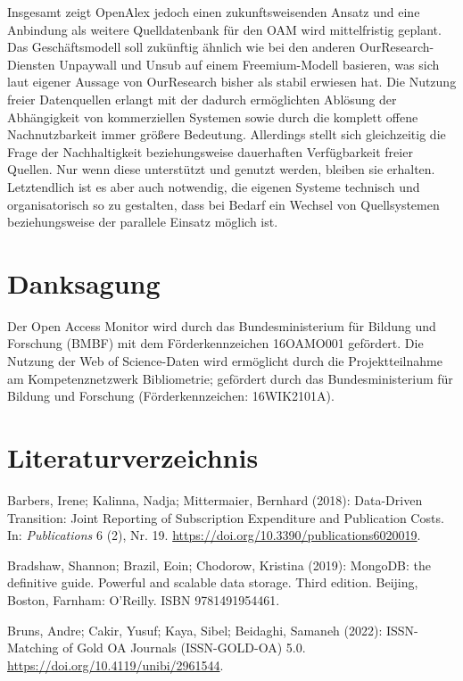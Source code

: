 \documentclass[a4paper,
fontsize=11pt,
oneside,
numbers=noperiodatend,
parskip=half-,
bibliography=totoc,
final
]{scrartcl}
\begin{document}
Insgesamt zeigt OpenAlex jedoch einen zukunftsweisenden Ansatz und eine
Anbindung als weitere Quelldatenbank für den OAM wird mittelfristig
geplant. Das Geschäftsmodell soll zukünftig ähnlich wie bei den anderen
OurResearch-Diensten Unpaywall und Unsub auf einem Freemium-Modell
basieren, was sich laut eigener Aussage von OurResearch bisher als
stabil erwiesen hat. Die Nutzung freier Datenquellen erlangt mit der
dadurch ermöglichten Ablösung der Abhängigkeit von kommerziellen
Systemen sowie durch die komplett offene Nachnutzbarkeit immer größere
Bedeutung. Allerdings stellt sich gleichzeitig die Frage der
Nachhaltigkeit beziehungsweise dauerhaften Verfügbarkeit freier Quellen.
Nur wenn diese unterstützt und genutzt werden, bleiben sie erhalten.
Letztendlich ist es aber auch notwendig, die eigenen Systeme technisch
und organisatorisch so zu gestalten, dass bei Bedarf ein Wechsel von
Quellsystemen beziehungsweise der parallele Einsatz möglich ist.

\hypertarget{danksagung}{%
\section{Danksagung}\label{danksagung}}

Der Open Access Monitor wird durch das Bundesministerium für Bildung und
Forschung (BMBF) mit dem Förderkennzeichen 16OAMO001 gefördert. Die
Nutzung der Web of Science-Daten wird ermöglicht durch die
Projektteilnahme am Kompetenznetzwerk Bibliometrie; gefördert durch das
Bundesministerium für Bildung und Forschung (Förderkennzeichen:
16WIK2101A).

\hypertarget{literaturverzeichnis}{%
\section{Literaturverzeichnis}\label{literaturverzeichnis}}

Barbers, Irene; Kalinna, Nadja; Mittermaier, Bernhard (2018):
Data-Driven Transition: Joint Reporting of Subscription Expenditure and
Publication Costs. In: \emph{Publications} 6 (2), Nr. 19.
\url{https://doi.org/10.3390/publications6020019}.

Bradshaw, Shannon; Brazil, Eoin; Chodorow, Kristina (2019): MongoDB: the
definitive guide. Powerful and scalable data storage. Third edition.
Beijing, Boston, Farnham: O'Reilly. ISBN 9781491954461.

Bruns, Andre; Cakir, Yusuf; Kaya, Sibel; Beidaghi, Samaneh (2022):
ISSN-Matching of Gold OA Journals (ISSN-GOLD-OA) 5.0.
\url{https://doi.org/10.4119/unibi/2961544}.
\end{document}
